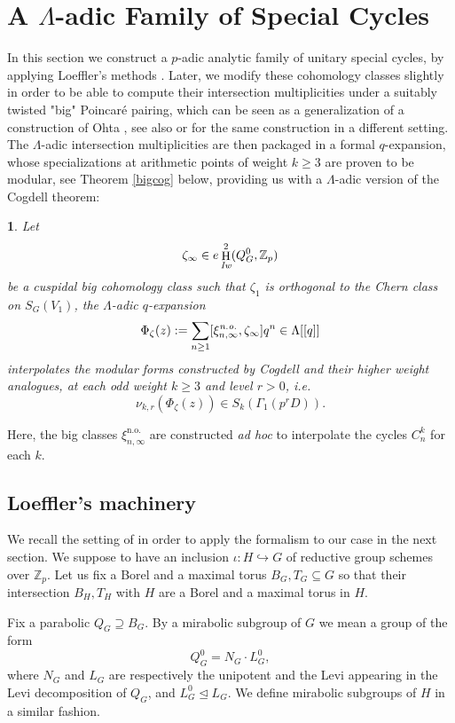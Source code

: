\documentclass[12pt,a4paper,reqno]{amsart}
\theoremstyle{definition}
\numberwithin{definition}{subsection}
\theoremstyle{definition}
\numberwithin{Definition}{subsection}
\theoremstyle{remark}
\theoremstyle{remark}
\numberwithin{Remark}{subsection}
\theoremstyle{remark}
\theoremstyle{plain}
\numberwithin{Theorem}{subsection}
\theoremstyle{plain}
\newcommand{\thistheoremname}{}
\newtheorem*{genericthm}{\thistheoremname}
\newenvironment{namedthm}[1]
  {\renewcommand{\thistheoremname}{#1}%
   \begin{genericthm}}
  {\end{genericthm}}
\theoremstyle{plain}
\theoremstyle{plain}
\theoremstyle{plain}
\theoremstyle{plain}
\theoremstyle{plain}
\theoremstyle{plain}
\newcommand*{\Z}{\mathbb{Z}}
\DeclareMathOperator{\h}{H}
\begin{document}
\section{A $\Lambda$-adic Family of Special Cycles}
In this section we construct a $p$-adic analytic family of unitary special cycles, by applying Loeffler's methods \cite{loeffler}. Later, we modify these cohomology classes slightly in order to be able to compute their intersection multiplicities under a suitably twisted "big" Poincaré pairing, which can be seen as a generalization of a construction of Ohta \cite[Proposition 4.1.13]{ohta}, see also \cite[Proposition 7.13]{fornea} or \cite[Lemma 1.1]{darmon} for the same construction in a different setting. The $\Lambda$-adic intersection multiplicities are then packaged in a formal $q$-expansion, whose specializations at arithmetic points of weight $k\geq 3$ are proven to be modular, see Theorem \ref{bigcog} below, providing us with a $\Lambda$-adic version of the Cogdell theorem:
\begin{namedthm}{Main Theorem}
Let $$\zeta_\infty\in e\h_{\emph{Iw}}^2(Q^0_G,\Z_p)$$ be a cuspidal big cohomology class such that $\zeta_1$ is orthogonal to the Chern class on $S_{G}(V_1)$, the $\Lambda$-adic $q$-expansion
\[
\Phi_{\zeta}(z):=\sum_{n\geq 1}[\xi_{n,\infty}^{\emph{n.o.}}, \zeta_\infty] q^n\in \Lambda[[q]]
\]
interpolates the modular forms constructed by Cogdell and their higher weight analogues, at each odd weight $k\geq 3$ and level $r> 0$, i.e.
\[
\nu_{k,r}(\Phi_{\zeta}(z))\in S_{k}(\Gamma_1(p^rD)).
\]
\end{namedthm}
Here, the big classes $\xi_{n,\infty}^{\text{n.o.}}$ are constructed \textit{ad hoc} to interpolate the cycles $C_n^k$ for each $k$.
\subsection{Loeffler's machinery}
\label{machinery}
We recall the setting of \cite[\S 4]{loeffler} in order to apply the formalism to our case in the next section.
We suppose to have an inclusion $\iota:H\hookrightarrow G$ of reductive group schemes over $\Z_p$. Let us fix a Borel and a maximal torus $B_G, T_G\subseteq G$ so that their intersection $B_H, T_H$ with $H$ are a Borel and a maximal torus in $H$.

Fix a parabolic $Q_G\supseteq B_G$. By a mirabolic subgroup of $G$ we mean a group of the form
\[
Q^0_G=N_G\cdot L^0_G,
\]
where $N_G$ and $L_G$ are respectively the unipotent and the Levi appearing in the Levi decomposition of $Q_G$, and $L^0_G\unlhd L_G$. We define mirabolic subgroups of $H$ in a similar fashion.
\end{document}
